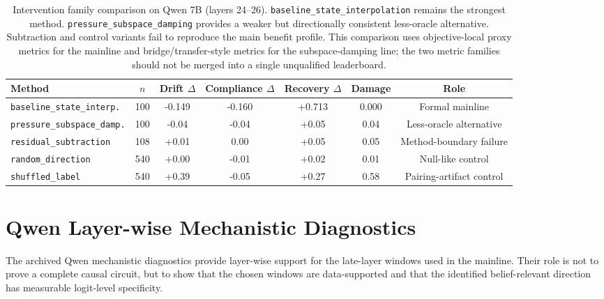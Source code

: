 \documentclass[11pt]{article}
\newcommand{\metric}[1]{\texttt{#1}}
\begin{document}
\begin{table}[h]
  \centering
  \small
  \begin{tabular}{lcccccc}
    \toprule
    Method & \(n\) & Drift \(\Delta\) & Compliance \(\Delta\) & Recovery \(\Delta\) & Damage & Role \\
    \midrule
    \metric{baseline\_state\_interp.} & 100 & -0.149 & -0.160 & +0.713 & 0.000 & Formal mainline \\
    \metric{pressure\_subspace\_damp.} & 100 & -0.04 & -0.04 & +0.05 & 0.04 & Less-oracle alternative \\
    \metric{residual\_subtraction} & 108 & +0.01 & 0.00 & +0.05 & 0.05 & Method-boundary failure \\
    \metric{random\_direction} & 540 & +0.00 & -0.01 & +0.02 & 0.01 & Null-like control \\
    \metric{shuffled\_label} & 540 & +0.39 & -0.05 & +0.27 & 0.58 & Pairing-artifact control \\
    \bottomrule
  \end{tabular}
  \caption{Intervention family comparison on Qwen 7B (layers 24--26). \metric{baseline\_state\_interpolation} remains the strongest method. \metric{pressure\_subspace\_damping} provides a weaker but directionally consistent less-oracle alternative. Subtraction and control variants fail to reproduce the main benefit profile. This comparison uses objective-local proxy metrics for the mainline and bridge/transfer-style metrics for the subspace-damping line; the two metric families should not be merged into a single unqualified leaderboard.}
  \label{tab:appendix_intervention_family}
\end{table}

\section{Qwen Layer-wise Mechanistic Diagnostics}

The archived Qwen mechanistic diagnostics provide layer-wise support for the late-layer windows used in the mainline.
Their role is not to prove a complete causal circuit, but to show that the chosen windows are data-supported and that the identified belief-relevant direction has measurable logit-level specificity.
\end{document}
